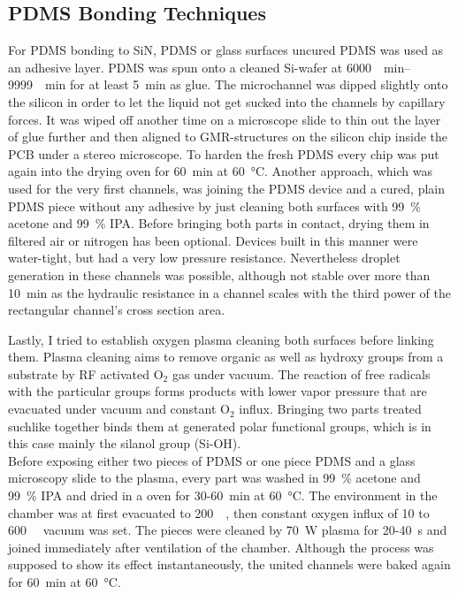 \subsection{PDMS Bonding Techniques}
For PDMS bonding to SiN, PDMS or glass surfaces uncured PDMS was used as an adhesive layer. PDMS was spun onto a cleaned Si-wafer at \SIrange{6000}{9999}{\per\minute} for at least \SI{5}{\minute} as glue. The microchannel was dipped slightly onto the silicon in order to let the liquid not get sucked into the channels by capillary forces. It was wiped off another time on a microscope slide to thin out the layer of glue further and then aligned to GMR-structures on the silicon chip inside the PCB under a stereo microscope. To harden the fresh PDMS every chip was put again into the drying oven for \SI{60}{\minute} at \SI{60}{\degreeCelsius}.\cite{lit:fluidics:pdms_bonding}
 \newpage
Another approach, which was used for the very first channels, was joining the PDMS device and a cured, plain PDMS piece  without any adhesive by just cleaning both surfaces with \SI{99}{\percent} acetone and \SI{99}{\percent} IPA. Before bringing both parts in contact, drying them in filtered air or nitrogen has been optional. Devices built in this manner were water-tight, but had a very low pressure resistance. Nevertheless droplet generation in these channels was possible, although not stable over more than \SI{10}{\minute} as the hydraulic resistance in a channel scales with the third power of the rectangular channel's cross section area.\cite{lit:fluidics:BioMEMS}
 
Lastly, I tried to establish oxygen plasma cleaning both surfaces before linking them. Plasma cleaning aims to remove organic as well as hydroxy groups from a substrate by RF activated O$_2$ gas under vacuum. The reaction of free radicals with the particular groups forms products with lower vapor pressure that are evacuated under vacuum and constant O$_2$ influx. Bringing two parts treated suchlike together binds them at generated polar functional groups, which is in this case mainly the silanol group (Si-OH).\\
Before exposing either two pieces of PDMS or one piece PDMS and a glass microscopy slide to the plasma, every part was washed in \SI{99}{\percent} acetone and \SI{99}{\percent} IPA and dried in a oven for 30-\SI{60}{\minute} at \SI{60}{\degreeCelsius}. The environment in the chamber was at first evacuated to \SI{200}{\milli\torr}, then constant oxygen influx of \SI{10}{\sccm} to \SI{600}{\milli\torr} vacuum was set. The pieces were cleaned by \SI{70}{\watt} plasma for 20-\SI{40}{\second} and joined immediately after ventilation of the chamber. Although the process was supposed to show its effect instantaneously, the united channels were baked again for \SI{60}{\minute} at \SI{60}{\degreeCelsius}.\cite{lit:fluidics:plasma_treatment}
\newpage
